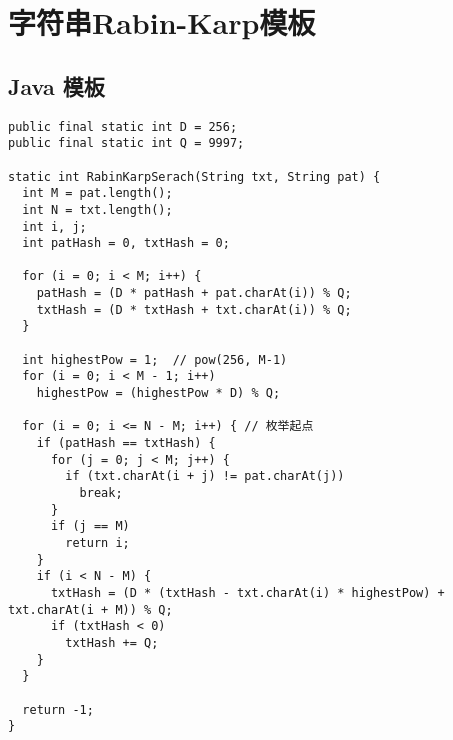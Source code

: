 \newpage
\section{字符串Rabin-Karp模板}

\subsection{Java 模板}

\begin{verbatim}
public final static int D = 256;
public final static int Q = 9997;

static int RabinKarpSerach(String txt, String pat) {
  int M = pat.length();
  int N = txt.length();
  int i, j;
  int patHash = 0, txtHash = 0;

  for (i = 0; i < M; i++) {
    patHash = (D * patHash + pat.charAt(i)) % Q;
    txtHash = (D * txtHash + txt.charAt(i)) % Q;
  }

  int highestPow = 1;  // pow(256, M-1)
  for (i = 0; i < M - 1; i++)
    highestPow = (highestPow * D) % Q;

  for (i = 0; i <= N - M; i++) { // 枚举起点
    if (patHash == txtHash) {
      for (j = 0; j < M; j++) {
        if (txt.charAt(i + j) != pat.charAt(j))
          break;
      }
      if (j == M)
        return i;
    }
    if (i < N - M) {
      txtHash = (D * (txtHash - txt.charAt(i) * highestPow) + txt.charAt(i + M)) % Q;
      if (txtHash < 0)
        txtHash += Q;
    }
  }

  return -1;
}
\end{verbatim}
